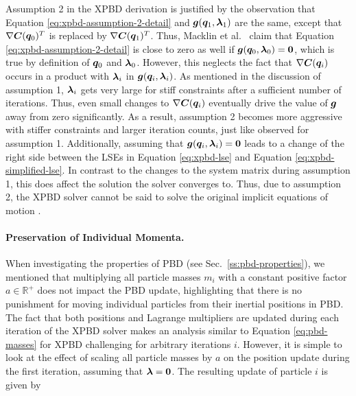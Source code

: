 Assumption 2 in the XPBD derivation is justified by the observation that Equation \ref{eq:xpbd-assumption-2-detail} and $\bm{g}(\bm{q}_1, 
\bm{\lambda}_1)$ are the same, except that $\nabla \bm{C}(\bm{q}_0)^T$ is replaced by $\nabla \bm{C}(\bm{q}_1)^T$. Thus, Macklin et al.\ 
\cite{macklin2016} claim that Equation \ref{eq:xpbd-assumption-2-detail} is close to zero as well if $\bm{g}(\bm{q}_0, \bm{\lambda}_0) = \bm{0}$, 
which is true by definition of $\bm{q}_0$ and $\bm{\lambda}_0$. However, this neglects the fact that $\nabla \bm{C}(\bm{q}_i)$ occurs in 
a product with $\bm{\lambda}_i$ in $\bm{g}(\bm{q}_i, \bm{\lambda}_i)$. As mentioned in the discussion of assumption 1, 
$\bm{\lambda}_i$ gets very large for stiff constraints after a 
sufficient number of iterations. Thus, even small changes to $\nabla \bm{C}(\bm{q}_i)$ eventually drive the value of $\bm{g}$ away from zero
significantly. As a result, assumption 2 becomes more aggressive with stiffer constraints and larger iteration counts, just like observed
for assumption 1. Additionally, assuming that $\bm{g}(\bm{q}_i, \bm{\lambda}_i) = \bm{0}$ leads to a change of the right side between 
the LSEs in Equation \ref{eq:xpbd-lse} and Equation \ref{eq:xpbd-simplified-lse}. In contrast to the changes to the system matrix during assumption 1, 
this does affect the solution the solver converges to. Thus, due to assumption 2, the XPBD solver cannot be said to solve the original 
implicit equations of motion \cite{macklin2016}.

\paragraph{Preservation of Individual Momenta.}
When investigating the properties of PBD (see Sec.\ \ref{ss:pbd-properties}), we mentioned that multiplying all particle masses $m_i$ with a constant
positive factor $a \in \mathbb{R}^+$ does not impact the PBD update, highlighting that there is no punishment for moving individual
particles from their inertial positions in PBD. The fact that both positions and Lagrange multipliers are updated during each
iteration of the XPBD solver makes an analysis similar to Equation \ref{eq:pbd-masses} for XPBD challenging for arbitrary iterations $i$. However, it 
is simple to look at the effect of scaling all particle masses by $a$ on the position update during the first iteration, assuming that 
$\bm{\lambda} = \bm{0}$. The resulting update of particle $i$ is given by


